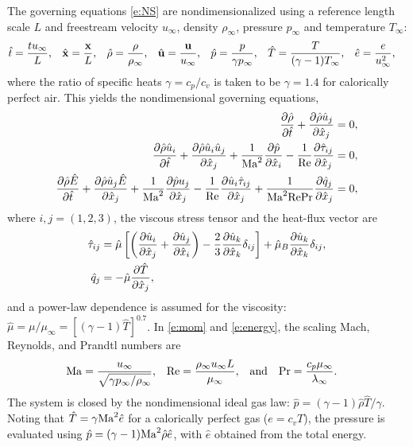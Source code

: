 \documentclass[letterpaper,10pt]{article}
\begin{document}
The governing equations \eqref{e:NS} are nondimensionalized using a reference length scale $L$ and freestream velocity $u_\infty$, density $\rho_\infty$, pressure $p_\infty$ and temperature $T_\infty$:
\begin{align*}
  \hat t&=\frac{t u_\infty}{L}, &
  \hat{\mathbf{x}}&=\frac{\mathbf{x}}{L}, &
  \hat\rho &= \frac{\rho}{\rho_\infty}, &
  \hat{\mathbf{u}} &= \frac{\mathbf{u}}{u_\infty}, &
  \hat p &= \frac{p}{\gamma p_\infty}, &
  \hat T &= \frac{T}{(\gamma-1)T_\infty}, &
  \hat e &= \frac{e}{u_\infty^2},
\end{align*}
where the ratio of specific heats $\gamma=c_p/c_v$ is taken to be $\gamma=1.4$ for calorically perfect air. This yields the nondimensional governing equations,
\begin{align}
  \frac{\partial \hat\rho}{\partial \hat t} + \frac{\partial \hat\rho\hat u_j}{\partial \hat x_j} &= 0, \label{e:mass} \\
  \frac{\partial \hat\rho\hat u_i}{\partial \hat t} + \frac{\partial \hat\rho\hat u_i\hat u_j}{\partial \hat x_j} + \frac{1}{\mathrm{Ma}^2}\frac{\partial \hat p}{\partial \hat x_i} - \frac{1}{\mathrm{Re}}\frac{\partial \hat\tau_{ij}}{\partial \hat x_j} &= 0, \label{e:mom} \\
  \frac{\partial \hat\rho\hat E}{\partial \hat t} + \frac{\partial \hat\rho\hat u_j\hat E}{\partial \hat x_j} + \frac{1}{\mathrm{Ma}^2}\frac{\partial \hat p u_j}{\partial \hat x_j} - \frac{1}{\mathrm{Re}}\frac{\partial \hat u_i\hat\tau_{ij}}{\partial \hat x_j} + \frac{1}{\mathrm{Ma}^2\mathrm{Re}\mathrm{Pr}}\frac{\partial \hat q_j}{\partial \hat x_j} &= 0, \label{e:energy}
\end{align}
where $i,j=(1,2,3)$, the viscous stress tensor and the heat-flux vector are
\begin{align*}
  \hat\tau_{ij} &= \hat\mu\left[\left(\frac{\partial \hat u_i}{\partial \hat x_j} + \frac{\partial \hat u_j}{\partial \hat x_i}\right) - \frac{2}{3}\frac{\partial \hat u_k}{\partial \hat x_k}\delta_{ij}\right] + \hat\mu_B\frac{\partial \hat u_k}{\partial \hat x_k}\delta_{ij}, \\
  \hat q_j &= -\hat\mu\frac{\partial \hat T}{\partial \hat x_j},
\end{align*}
and a power-law dependence is assumed for the viscosity: $\hat\mu = \mu/\mu_\infty = \left[(\gamma-1)\hat T\right]^{0.7}$.
In \eqref{e:mom} and \eqref{e:energy}, the scaling Mach, Reynolds, and Prandtl numbers are
\begin{align*}
  \mathrm{Ma} &= \frac{u_\infty}{\sqrt{\gamma p_\infty/\rho_\infty}}, &
  \mathrm{Re} &= \frac{\rho_\infty u_\infty L}{\mu_\infty}, & &\mathrm{and} &
  \mathrm{Pr} &= \frac{c_p\mu_\infty}{\lambda_\infty}.
\end{align*}
The system is closed by the nondimensional ideal gas law: $\hat p = (\gamma-1)\hat\rho\hat T/\gamma$. Noting that $\hat T=\gamma\mathrm{Ma}^2\hat e$ for a calorically perfect gas ($e=c_v T$), the pressure is evaluated using $\hat p=(\gamma-1)\mathrm{Ma}^2\hat\rho\hat e$, with $\hat e$ obtained from the total energy.
\end{document}
